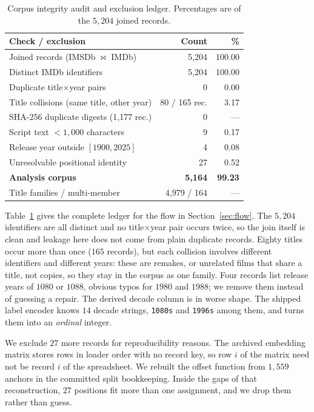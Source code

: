 \documentclass[conference,a4paper]{IEEEtran}
\begin{document}
\begin{table}[t]
\caption{Corpus integrity audit and exclusion ledger. Percentages are of
the $5{,}204$ joined records.}
\label{tab:audit}
\centering
\small
\begin{tabular}{lrr}
\toprule
\textbf{Check / exclusion} & \textbf{Count} & \textbf{\%} \\
\midrule
Joined records (IMSDb $\bowtie$ IMDb)      & 5{,}204 & 100.00 \\
Distinct IMDb identifiers                  & 5{,}204 & 100.00 \\
Duplicate title$\times$year pairs          &       0 &   0.00 \\
Title collisions (same title, other year)  &  80 / 165 rec. & 3.17 \\
SHA-256 duplicate digests (1{,}177 rec.)   &       0 & --- \\
\addlinespace[2pt]
Script text $<1{,}000$ characters          &       9 &   0.17 \\
Release year outside $[1900, 2025]$        &       4 &   0.08 \\
Unresolvable positional identity           &      27 &   0.52 \\
\midrule
\textbf{Analysis corpus}                   & \textbf{5{,}164} & \textbf{99.23} \\
Title families / multi-member              & 4{,}979 / 164 & --- \\
\bottomrule
\end{tabular}
\end{table}

Table~\ref{tab:audit} gives the complete ledger for the flow in
Section~\ref{sec:flow}. The $5{,}204$ identifiers are all distinct and no
title$\times$year pair occurs twice, so the join itself is clean and
leakage here does not come from plain duplicate records. Eighty titles
occur more than once ($165$ records), but each collision involves
different identifiers and different years: these are remakes, or
unrelated films that share a title, not copies, so they stay in the
corpus as one family. Four records list release years of $1080$ or
$1088$, obvious typos for $1980$ and $1988$; we remove them instead of
guessing a repair. The derived decade column is in worse shape. The
shipped label encoder knows $14$ decade strings, \texttt{1080s} and
\texttt{1996s} among them, and turns them into an \emph{ordinal}
integer.

We exclude $27$ more records for reproducibility reasons. The archived
embedding matrix stores rows in loader order with no record key, so row
$i$ of the matrix need not be record $i$ of the spreadsheet. We rebuilt
the offset function from $1{,}559$ anchors in the committed split
bookkeeping. Inside the gaps of that reconstruction, $27$ positions fit
more than one assignment, and we drop them rather than guess.
\end{document}
